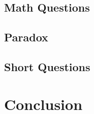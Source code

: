 \documentclass[a4paper,oneside, margin=1.4in]{book}
\begin{document}
\section{Math Questions}


\section{Paradox}

\section{Short Questions}

\backmatter
\chapter{Conclusion}
\lipsum[8]

\tableofcontents
\end{document}
